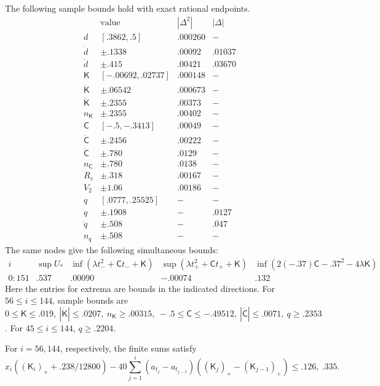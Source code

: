 \begin{lemma}\label{lem:scalar-certificates}
The following sample bounds hold with exact rational endpoints.
\[
\begin{array}{c|c|c|c}
 &\text{value} & |\Delta^2| &|\Delta|\\ \hline
 d&[.3862,.5]&.000260&-\\
 \dot d&\pm.1338&.00092&.01037\\
 \ddot d&\pm.415&.00421&.03670\\
 \mathsf K&[-.00692,.02737]&.000148&-\\
 \dot{\mathsf K}&\pm.06542&.000673&-\\
 \ddot{\mathsf K}&\pm.2355&.00373&-\\
 n_{\mathsf K}&\pm.2355&.00402&-\\
 \mathsf C&[-.5,-.3413]&.00049&-\\
 \dot{\mathsf C}&\pm.2456&.00222&-\\
 \ddot{\mathsf C}&\pm.780&.0129&-\\
 n_{\mathsf C}&\pm.780&.0138&-\\
 R_v&\pm.318&.00167&-\\
 V_2&\pm1.06&.00186&-\\
 q&[.0777,.25525]&-&-\\
 \dot q&\pm.1908&-&.0127\\
 \ddot q&\pm.508&-&.047\\
 n_q&\pm.508&-&-
\end{array}
\]
The same nodes give the following simultaneous bounds:
\[
\begin{array}{c|cccc}
 i&\sup U_*&\inf(\lambda t_-^2+\mathsf Ct_-+\mathsf K)&\sup(\lambda t_+^2+\mathsf Ct_++\mathsf K)&
 \inf(2(-.37)\mathsf C-.37^2-4\lambda\mathsf K)\\\hline
 0{:}151&.537&.00090&-.00074&.132
\end{array}
\]
Here the entries for extrema are bounds in the indicated directions. For \(56\le i\le144\), sample bounds are \(0\le\mathsf K\le.019,\ |\dot{\mathsf K}|\le.0207,\ n_{\mathsf K}\ge.00315,\ -.5\le\mathsf C\le-.49512,\ |\dot{\mathsf C}|\le.0071,\ q\ge.2353\). For \(45\le i\le144\), \(q\ge.2204\).

For \(i=56,144\), respectively, the finite sums satisfy
\[
 x_i ((\mathsf K_i)_+ + .238/12800) -
 40\sum_{j=1}^{i} (a_{t_j}-a_{t_{j-1}})((\mathsf K_j)_+-(\mathsf K_{j-1})_+)
 \le .126,\ .335 .
\]
\end{lemma}

